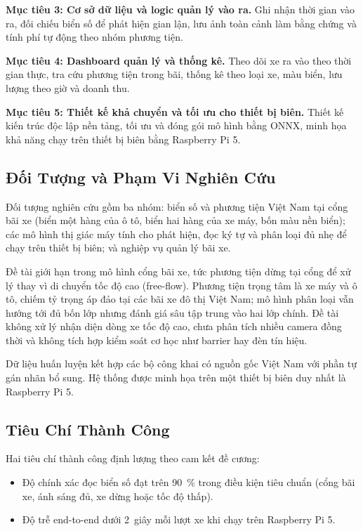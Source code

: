 \textbf{Mục tiêu 3: Cơ sở dữ liệu và logic quản lý vào ra.}
Ghi nhận thời gian vào ra, đối chiếu biển số để phát hiện gian lận, lưu ảnh toàn cảnh
làm bằng chứng và tính phí tự động theo nhóm phương tiện.

\textbf{Mục tiêu 4: Dashboard quản lý và thống kê.}
Theo dõi xe ra vào theo thời gian thực, tra cứu phương tiện trong bãi, thống kê theo
loại xe, màu biển, lưu lượng theo giờ và doanh thu.

\textbf{Mục tiêu 5: Thiết kế khả chuyển và tối ưu cho thiết bị biên.}
Thiết kế kiến trúc độc lập nền tảng, tối ưu và đóng gói mô hình bằng ONNX, minh họa khả
năng chạy trên thiết bị biên bằng Raspberry Pi 5.

\subsection{Đối Tượng và Phạm Vi Nghiên Cứu}

Đối tượng nghiên cứu gồm ba nhóm: biển số và phương tiện Việt Nam tại cổng bãi xe (biển
một hàng của ô tô, biển hai hàng của xe máy, bốn màu nền biển); các mô hình thị giác máy
tính cho phát hiện, đọc ký tự và phân loại đủ nhẹ để chạy trên thiết bị biên; và nghiệp
vụ quản lý bãi xe.

Đề tài giới hạn trong mô hình cổng bãi xe, tức phương tiện dừng tại cổng để xử lý thay
vì di chuyển tốc độ cao (free-flow). Phương tiện trọng tâm là xe máy và ô tô, chiếm tỷ
trọng áp đảo tại các bãi xe đô thị Việt Nam; mô hình phân loại vẫn hướng tới đủ bốn lớp
nhưng đánh giá sâu tập trung vào hai lớp chính. Đề tài không xử lý nhận diện dòng xe tốc
độ cao, chưa phân tích nhiều camera đồng thời và không tích hợp kiểm soát cơ học như
barrier hay đèn tín hiệu.

Dữ liệu huấn luyện kết hợp các bộ công khai có nguồn gốc Việt Nam với phần tự gán nhãn
bổ sung. Hệ thống được minh họa trên một thiết bị biên duy nhất là Raspberry Pi 5.

\subsection{Tiêu Chí Thành Công}

Hai tiêu chí thành công định lượng theo cam kết đề cương:

\begin{itemize}
  \item Độ chính xác đọc biển số đạt trên \SI{90}{\percent} trong điều kiện tiêu chuẩn
        (cổng bãi xe, ánh sáng đủ, xe dừng hoặc tốc độ thấp).
  \item Độ trễ end-to-end dưới \SI{2}{giây} mỗi lượt xe khi chạy trên Raspberry Pi 5.
\end{itemize}

